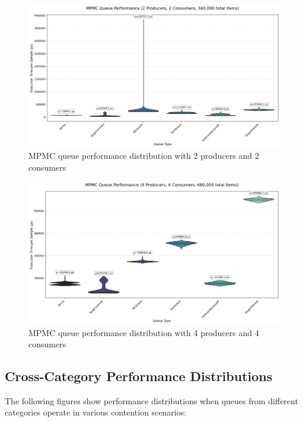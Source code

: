 \begin{figure}[H]
\centering
\caption{MPMC queue performance distribution with 2 producers and 2 consumers}
\label{fig:mpmc-violin-2p2c}
\includegraphics[width=\textwidth]{images/results/mpmc_performance_violin_2P_2C.png}
\end{figure}

\begin{figure}[H]
\centering
\caption{MPMC queue performance distribution with 4 producers and 4 consumers}
\label{fig:mpmc-violin-4p4c}
\includegraphics[width=\textwidth]{images/results/mpmc_performance_violin_4P_4C.png}
\end{figure}

\subsection{Cross-Category Performance Distributions}
The following figures show performance distributions when queues from different categories operate in various contention scenarios:

